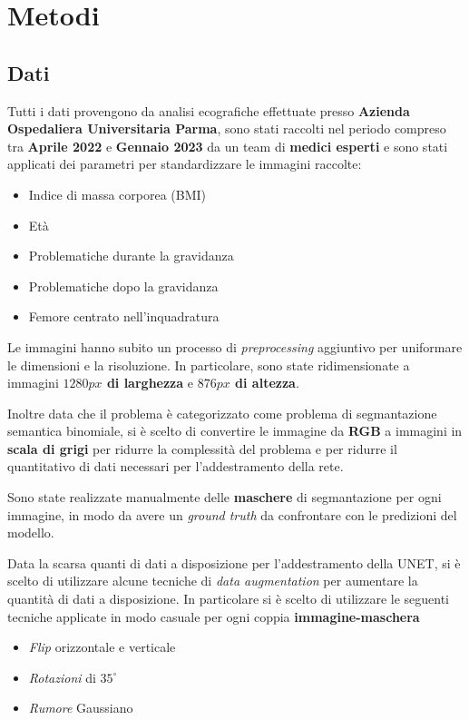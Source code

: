\chapter{Metodi} %
\label{cha:Metodi}

\section{Dati} %
Tutti i dati provengono da analisi ecografiche effettuate presso 
\textbf{Azienda Ospedaliera Universitaria Parma}, sono stati raccolti nel periodo compreso tra 
\textbf{Aprile 2022} e \textbf{Gennaio 2023} da un team di \textbf{medici esperti} e sono stati applicati
dei parametri per standardizzare le immagini raccolte:
\begin{itemize}
    \item Indice di massa corporea (BMI)
    \item Età
    \item Problematiche durante la gravidanza
    \item Problematiche dopo la gravidanza
    \item Femore centrato nell'inquadratura
\end{itemize}



Le immagini hanno subito un processo di \textit{preprocessing} aggiuntivo per
uniformare le dimensioni e la risoluzione. In particolare, sono state
ridimensionate a immagini \textbf{$1280px$ di larghezza} e \textbf{$876px$ di
altezza}.

Inoltre data che il problema è categorizzato come problema di segmantazione
semantica binomiale, si è scelto di convertire le immagine da \textbf{RGB} a
immagini in \textbf{scala di grigi} per ridurre la complessità del problema e
per ridurre il quantitativo di dati necessari per l'addestramento della rete.

Sono state realizzate manualmente delle \textbf{maschere} di segmantazione per
ogni immagine, in modo da avere un \textit{ground truth} da confrontare con le
predizioni del modello.

Data la scarsa quanti di dati a disposizione per l'addestramento della UNET, si è scelto di utilizzare alcune tecniche di \textit{data augmentation} per aumentare la quantità di dati a disposizione. In particolare si è scelto di utilizzare le seguenti tecniche applicate in modo casuale per ogni coppia \textbf{immagine-maschera}
\begin{itemize}
	\item \textit{Flip} orizzontale e verticale
	\item \textit{Rotazioni} di $35^{\circ}$
	\item \textit{Rumore} Gaussiano
\end{itemize}


